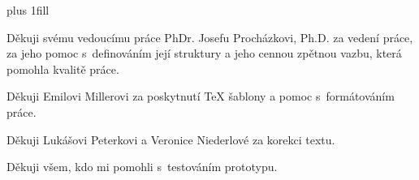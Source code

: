 \vglue 0pt plus 1fill

Děkuji svému vedoucímu práce PhDr. Josefu Procházkovi, Ph.D. za vedení práce, za jeho pomoc s~definováním její struktury a jeho cennou zpětnou vazbu, která pomohla kvalitě práce.

Děkuji Emilovi Millerovi za poskytnutí TeX šablony a pomoc s~formátováním práce.

Děkuji Lukášovi Peterkovi a Veronice Niederlové za korekci textu.

Děkuji všem, kdo mi pomohli s~testováním prototypu.

\vspace{20mm}
\newpage

